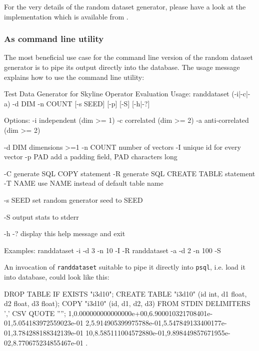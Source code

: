 For the very details of the random dataset generator, please have a
look at the implementation which is available from \citep{Eder2007a}.

\vfill
\pagebreak[4]

\subsubsection{As command line utility}

The most beneficial use case for the command line version of the
random dataset generator is to pipe its output directly into the
database. The usage message explains how to use the command line
utility:

\begin{interactive}
Test Data Generator for Skyline Operator Evaluation
Usage: randdataset (-i|-c|-a) -d DIM -n COUNT [-s SEED] [-p] [-S] [-h|-?]

Options:
       -i       independent (dim >= 1)
       -c       correlated (dim >= 2)
       -a       anti-correlated (dim >= 2)

       -d DIM   dimensions >=1
       -n COUNT number of vectors
       -I       unique id for every vector
       -p PAD   add a padding field, PAD characters long

       -C       generate SQL COPY statement
       -R       generate SQL CREATE TABLE statement
       -T NAME  use NAME instead of default table name

       -s SEED  set random generator seed to SEED

       -S       output stats to stderr

       -h -?    display this help message and exit

Examples:
       randdataset -i -d 3 -n 10 -I -R
       randdataset -a -d 2 -n 100 -S
\end{interactive}

An invocation of \texttt{randdataset} suitable to pipe it directly
into \texttt{psql}, i.e. load it into database, could look like this:

\begin{interactive}
DROP TABLE IF EXISTS "i3d10";
CREATE TABLE "i3d10" (id int, d1 float, d2 float, d3 float);
COPY "i3d10" (id, d1, d2, d3) FROM STDIN DELIMITERS ',' CSV QUOTE '''';
1,0.000000000000000e+00,6.900010321708401e-01,5.054183972559023e-01
2,5.914905399975788e-01,5.547849133400177e-01,3.784288188342139e-01
\ellipsis{}
10,8.585111004572880e-01,9.898449857671955e-02,8.770675234855467e-01
\ttbackslash.
\end{interactive}

